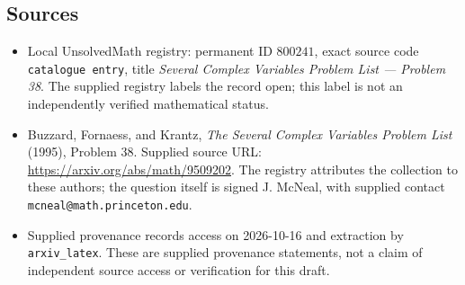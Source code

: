 \documentclass[11pt]{article}
\begin{document}
\subsection{Sources}
\begin{itemize}
\item Local UnsolvedMath registry: permanent ID \(800241\), exact source code \texttt{catalogue entry}, title \emph{Several Complex Variables Problem List --- Problem 38}. The supplied registry labels the record open; this label is not an independently verified mathematical status.
\item Buzzard, Fornaess, and Krantz, \emph{The Several Complex Variables Problem List} (1995), Problem 38. Supplied source URL: \url{https://arxiv.org/abs/math/9509202}. The registry attributes the collection to these authors; the question itself is signed J. McNeal, with supplied contact \texttt{mcneal@math.princeton.edu}.
\item Supplied provenance records access on 2026-10-16 and extraction by \texttt{arxiv\_latex}. These are supplied provenance statements, not a claim of independent source access or verification for this draft.
\end{itemize}
\end{document}
